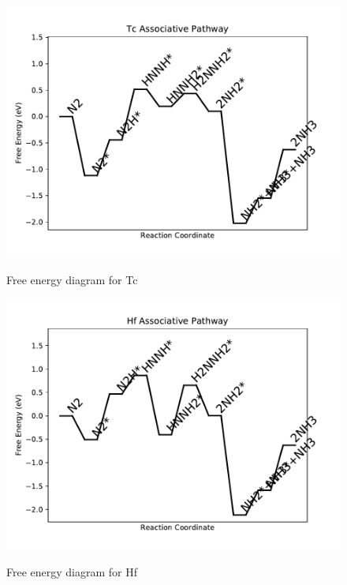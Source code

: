 \documentclass[journal=jacsat,manuscript=article]{achemso}
\begin{document}
\begin{figure}
\includegraphics[width=1\linewidth]{data/plots/Tc_associative.pdf}
\label{fig:Tc_associative}
\caption{Free energy diagram for Tc}
\end{figure}

\newpage
\begin{figure}
\includegraphics[width=1\linewidth]{data/plots/Hf_associative.pdf}
\label{fig:Hf_associative}
\caption{Free energy diagram for Hf}
\end{figure}
\end{document}
